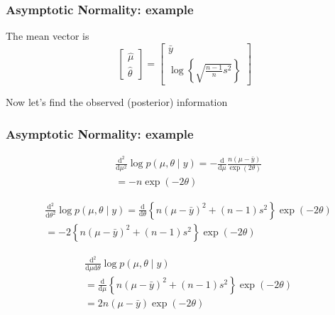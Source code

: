 \documentclass{beamer}
\begin{document}
\begin{frame}
\frametitle{Asymptotic Normality: example}

The mean vector is
$$
\left[\begin{array}{c}
\hat{\mu} \\
\hat{\theta}
\end{array}\right]
= 
\left[\begin{array}{c}
\bar{y}\\
\log \left\{ \sqrt{ \frac{n-1}{n}s^2}  \right\}
\end{array}\right]
$$

Now let's find the observed (posterior) information

\end{frame}

\begin{frame}
\frametitle{Asymptotic Normality: example}

\begin{align*}
&\frac{\text{d}^2}{\text{d} \mu^2} \log p(\mu, \theta \mid y) = - \frac{\text{d}}{\text{d} \mu}  \frac{n(\mu - \bar{y})}{ \exp(2\theta) }  \\
&= - n \exp(-2\theta)
\end{align*}

\begin{align*}
& \frac{\text{d}^2}{\text{d} \theta^2} \log p(\mu, \theta \mid y) =  \frac{\text{d}}{\text{d} \theta} \left\{ n(\mu - \bar{y})^2 + (n-1)s^2 \right\} \exp(-2\theta) \\
&=  -2 \left\{ n(\mu - \bar{y})^2 + (n-1)s^2 \right\} \exp(-2\theta) 
\end{align*}

\begin{align*}
& \frac{\text{d}^2}{\text{d} \mu \text{d} \theta} \log p(\mu, \theta \mid y) \\
&=  \frac{\text{d}}{\text{d} \mu} \left\{ n(\mu - \bar{y})^2 + (n-1)s^2 \right\} \exp(-2\theta) \\
&=  2 n(\mu - \bar{y})\exp(-2\theta) 
\end{align*}


\end{frame}
\end{document}
